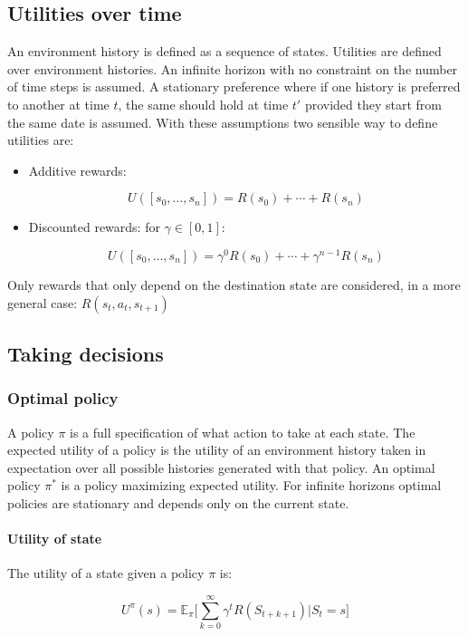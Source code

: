 	\subsection{Utilities over time}
	An environment history is defined as a sequence of states.
	Utilities are defined over environment histories.
	An infinite horizon with no constraint on the number of time steps is assumed.
	A stationary preference where if one history is preferred to another at time $t$, the same should hold at time $t'$ provided they start from the same date is assumed.
	With these assumptions two sensible way to define utilities are:

	\begin{itemize}
		\item Additive rewards:

			$$U([s_0,\dots,s_n]) = R(s_0) + \cdots +R(s_n)$$

		\item Discounted rewards: for $\gamma\in[0,1]$:

			$$U([s_0,\dots,s_n]) = \gamma^0R(s_0) + \cdots +\gamma^{n-1}R(s_n)$$

	\end{itemize}

	Only rewards that only depend on the destination state are considered, in a more general case: $R(s_t, a_t, s_{t+1})$

	\subsection{Taking decisions}

		\subsubsection{Optimal policy}
		A policy $\pi$ is a full specification of what action to take at each state.
		The expected utility of a policy is the utility of an environment history taken in expectation over all possible histories generated with that policy.
		An optimal policy $\pi^*$ is a policy maximizing expected utility.
		For infinite horizons optimal policies are stationary and depends only on the current state.

			\paragraph{Utility of state}
			The utility of a state given a policy $\pi$ is:

			$$U^\pi(s) = \mathbb{E}_\pi\biggl[\sum\limits_{k=0}^\infty\gamma^tR(S_{t+k+1})|S_t=s\biggr]$$

